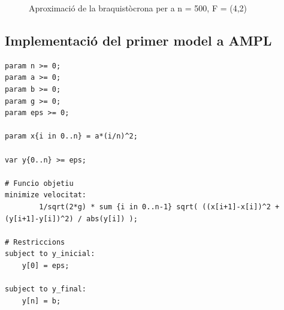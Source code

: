 \documentclass[10pt]{extarticle}
\begin{document}
\begin{figure}[H]
    \begin{center}
        \caption{Aproximació de la braquistòcrona per a n = 500, F = (4,2)}
        \label{Aprox_4_2}
    \end{center}
\end{figure}


\subsection{Implementació del primer model a AMPL}
\begin{lstlisting}
param n >= 0;
param a >= 0;
param b >= 0;
param g >= 0;
param eps >= 0;

param x{i in 0..n} = a*(i/n)^2;

var y{0..n} >= eps;

# Funcio objetiu
minimize velocitat:
		1/sqrt(2*g) * sum {i in 0..n-1} sqrt( ((x[i+1]-x[i])^2 + (y[i+1]-y[i])^2) / abs(y[i]) );

# Restriccions
subject to y_inicial:
	y[0] = eps;

subject to y_final:
	y[n] = b;
\end{lstlisting}
\end{document}
